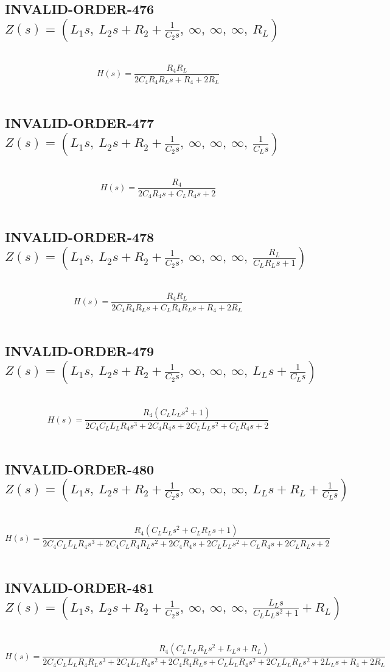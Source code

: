 \documentclass{article}
\begin{document}
\subsection{INVALID-ORDER-476 $Z(s) = \left( L_{1} s, \  L_{2} s + R_{2} + \frac{1}{C_{2} s}, \  \infty, \  \infty, \  \infty, \  R_{L}\right)$ } \ 
\textbf{\[H(s) = \frac{R_{4} R_{L}}{2 C_{4} R_{4} R_{L} s + R_{4} + 2 R_{L}}\] } \ 
\subsection{INVALID-ORDER-477 $Z(s) = \left( L_{1} s, \  L_{2} s + R_{2} + \frac{1}{C_{2} s}, \  \infty, \  \infty, \  \infty, \  \frac{1}{C_{L} s}\right)$ } \ 
\textbf{\[H(s) = \frac{R_{4}}{2 C_{4} R_{4} s + C_{L} R_{4} s + 2}\] } \ 
\subsection{INVALID-ORDER-478 $Z(s) = \left( L_{1} s, \  L_{2} s + R_{2} + \frac{1}{C_{2} s}, \  \infty, \  \infty, \  \infty, \  \frac{R_{L}}{C_{L} R_{L} s + 1}\right)$ } \ 
\textbf{\[H(s) = \frac{R_{4} R_{L}}{2 C_{4} R_{4} R_{L} s + C_{L} R_{4} R_{L} s + R_{4} + 2 R_{L}}\] } \ 
\subsection{INVALID-ORDER-479 $Z(s) = \left( L_{1} s, \  L_{2} s + R_{2} + \frac{1}{C_{2} s}, \  \infty, \  \infty, \  \infty, \  L_{L} s + \frac{1}{C_{L} s}\right)$ } \ 
\textbf{\[H(s) = \frac{R_{4} \left(C_{L} L_{L} s^{2} + 1\right)}{2 C_{4} C_{L} L_{L} R_{4} s^{3} + 2 C_{4} R_{4} s + 2 C_{L} L_{L} s^{2} + C_{L} R_{4} s + 2}\] } \ 
\subsection{INVALID-ORDER-480 $Z(s) = \left( L_{1} s, \  L_{2} s + R_{2} + \frac{1}{C_{2} s}, \  \infty, \  \infty, \  \infty, \  L_{L} s + R_{L} + \frac{1}{C_{L} s}\right)$ } \ 
\textbf{\[H(s) = \frac{R_{4} \left(C_{L} L_{L} s^{2} + C_{L} R_{L} s + 1\right)}{2 C_{4} C_{L} L_{L} R_{4} s^{3} + 2 C_{4} C_{L} R_{4} R_{L} s^{2} + 2 C_{4} R_{4} s + 2 C_{L} L_{L} s^{2} + C_{L} R_{4} s + 2 C_{L} R_{L} s + 2}\] } \ 
\subsection{INVALID-ORDER-481 $Z(s) = \left( L_{1} s, \  L_{2} s + R_{2} + \frac{1}{C_{2} s}, \  \infty, \  \infty, \  \infty, \  \frac{L_{L} s}{C_{L} L_{L} s^{2} + 1} + R_{L}\right)$ } \ 
\textbf{\[H(s) = \frac{R_{4} \left(C_{L} L_{L} R_{L} s^{2} + L_{L} s + R_{L}\right)}{2 C_{4} C_{L} L_{L} R_{4} R_{L} s^{3} + 2 C_{4} L_{L} R_{4} s^{2} + 2 C_{4} R_{4} R_{L} s + C_{L} L_{L} R_{4} s^{2} + 2 C_{L} L_{L} R_{L} s^{2} + 2 L_{L} s + R_{4} + 2 R_{L}}\] } \ 
\end{document}
